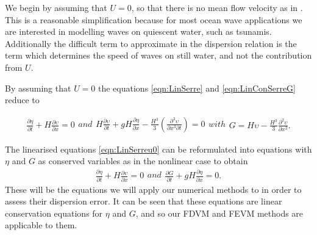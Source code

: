 We begin by assuming that $U = 0$, so that there is no mean flow velocity as in \cite{Filippini-etal-2016-381}. This is a reasonable simplification because for most ocean wave applications we are interested in modelling waves on quiescent water, such as tsunamis. Additionally the difficult term to approximate in the dispersion relation is the term which determines the speed of waves on still water, and not the contribution from $U$.

By assuming that $U= 0$ the equations \eqref{eqn:LinSerre} and \eqref{eqn:LinConSerreG} reduce to

\begin{subequations}
	\label{eqn:LinSerreu0}
	\begin{gather}
	\label{eqn:LinContu0}
	\frac{\partial  \eta}{\partial  t} + H\frac{\partial  \upsilon}{\partial  x} = 0
	\end{gather}
	and
	\begin{gather}
	\label{eqn:LineMomeu0}
	H\frac{\partial  \upsilon}{\partial  t} + g H \frac{\partial  \eta}{\partial  x} - \frac{H^3}{3}\left(\frac{\partial^3  \upsilon}{\partial  x^3 \partial  t}  \right)  = 0
	\end{gather}	
with
	\begin{gather}
	G = H\upsilon -\frac{H^3}{3} \frac{\partial^2 \upsilon}{\partial x^2}.
	\label{eqn:LinConSerreGu0}
	\end{gather}	
\end{subequations}

The linearised equations \eqref{eqn:LinSerreu0} can be reformulated into equations with $\eta$ and $G$ as conserved variables as in the nonlinear case to obtain
\begin{subequations}
	\begin{gather}
	\label{eqn:LinContG}
	\frac{\partial  \eta}{\partial  t} + H\frac{\partial  \upsilon}{\partial  x} = 0
	\end{gather}
	and
	\begin{gather}
	\label{eqn:LineMomeG}
	\frac{\partial  G}{\partial  t} + g H \frac{\partial  \eta}{\partial  x}  = 0.
	\end{gather}
	\label{eqn:LinSerreG}	
\end{subequations}
These will be the equations we will apply our numerical methods to in order to assess their dispersion error. It can be seen that these equations are linear conservation equations for $\eta$ and $G$, and so our FDVM and FEVM methods are applicable to them.

